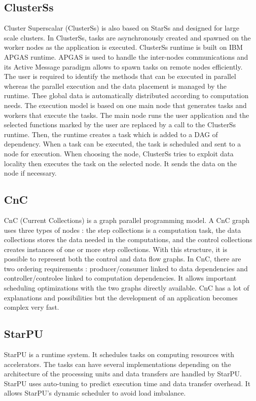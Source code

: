\subsection{ClusterSs}
Cluster Superscalar (ClusterSs) \cite{TFGBA2011} is also based on StarSs \cite{PerRL2007} and designed for large scale clusters.
In ClusterSs, tasks are asynchronously created and spawned on the worker nodes as the application is executed.
ClusterSs runtime is built on IBM APGAS runtime.
APGAS is used to handle the inter-nodes communications and its Active Message paradigm allows to spawn tasks on remote nodes efficiently.
The user is required to identify the methods that can be executed in parallel whereas the parallel execution and the data placement is managed by the runtime.
Thee global data is automatically distributed according to computation needs.
The execution model is based on one main node that generates tasks and workers that execute the tasks.
The main node runs the user application and the selected functions marked by the user are replaced by a call to the ClusterSs runtime.
Then, the runtime creates a task which is added to a DAG of dependency.
When a task can be executed, the task is scheduled and sent to a node for execution.
When choosing the node, ClusterSs tries to exploit data locality then executes the task on the selected node.
It sends the data on the node if necessary.

\subsection{CnC}
CnC \cite{ChaKV2010} \cite{BBCKL2010} (Current Collections) is a graph parallel programming model.
A CnC graph uses three types of nodes : the step collections is a computation task, the data collections stores the data needed in the computations, and the control collections creates instances of one or more step collections.
With this structure, it is possible to represent both the control and data flow graphs.
In CnC, there are two ordering requirements : producer/consumer linked to data dependencies and controller/controlee linked to computation dependencies.
It allows important scheduling optimizations with the two graphs directly available.
CnC has a lot of explanations and possibilities but the development of an application becomes complex very fast.

\subsection{StarPU}
StarPU \cite{AuTNW2011} is a runtime system.
It schedules tasks on computing resources with accelerators.
The tasks can have several implementations depending on the architecture of the processing units and data transfers are handled by StarPU.
StarPU uses auto-tuning to predict execution time and data transfer overhead.
It allows StarPU's dynamic scheduler to avoid load imbalance.

